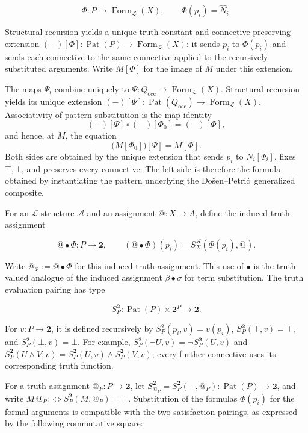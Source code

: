 \documentclass[11pt]{article}
\makeatletter
\newcommand{\atsign}{\mathord{@}}
\newcommand{\DP}{Do\v{s}en--Petri\'{c}}
\makeatother
\begin{document}
\[
\Phi:P\longrightarrow\operatorname{Form}_{\mathcal L}(X),
\qquad \Phi(p_i)=\widehat N_i.
\]

Structural recursion yields a unique truth-constant-and-connective-preserving extension
\((-)[\Phi]:\operatorname{Pat}(P)\to
\operatorname{Form}_{\mathcal L}(X)\): it sends \(p_i\) to \(\Phi(p_i)\)
and sends each connective to the same connective applied to the recursively
substituted arguments. Write \(M[\Phi]\) for the image of \(M\) under this
extension.

The maps \(\Psi_i\) combine uniquely to
\(\Psi:Q_{\mathrm{occ}}\to\operatorname{Form}_{\mathcal L}(X)\).
Structural recursion yields its unique extension
\((-)[\Psi]:\operatorname{Pat}(Q_{\mathrm{occ}})\to
\operatorname{Form}_{\mathcal L}(X)\). Associativity of pattern substitution
is the map identity
\[
(-)[\Psi]\circ(-)[\Phi_0]=(-)[\Phi],
\]
and hence, at \(M\), the equation
\[
\bigl(M[\Phi_0]\bigr)[\Psi]=M[\Phi].
\]
Both sides are obtained by the unique extension that sends \(p_i\) to
\(N_i[\Psi_i]\), fixes \(\top,\bot\), and preserves every connective. The
left side is therefore the formula obtained by instantiating the pattern
underlying the \DP\ generalized composite.

For an \(\mathcal L\)-structure \(\mathcal A\) and an assignment
\(\atsign:X\to A\), define the induced truth assignment

\[
\atsign\mathbin\bullet\Phi:P\longrightarrow\mathbf 2,
\qquad
(\atsign\mathbin\bullet\Phi)(p_i)
=S_X^{\mathcal A}(\Phi(p_i),\atsign).
\]

Write \(\atsign_\Phi:=\atsign\mathbin\bullet\Phi\) for this induced truth
assignment.
This use of \(\mathbin\bullet\) is the truth-valued analogue of the induced
assignment \(\beta\mathbin\bullet\sigma\) for term substitution. The truth
evaluation pairing has type

\[
S_P^{\mathbf 2}:\operatorname{Pat}(P)\times\mathbf 2^P
\longrightarrow\mathbf 2.
\]

For \(v:P\to\mathbf2\), it is defined recursively by
\(S_P^{\mathbf2}(p_i,v)=v(p_i)\),
\(S_P^{\mathbf2}(\top,v)=\top\), and
\(S_P^{\mathbf2}(\bot,v)=\bot\). For example,
\(S_P^{\mathbf2}(\neg U,v)=\neg S_P^{\mathbf2}(U,v)\) and
\(S_P^{\mathbf2}(U\wedge V,v)=
S_P^{\mathbf2}(U,v)\wedge S_P^{\mathbf2}(V,v)\); every further connective
uses its corresponding truth function.

For a truth assignment \(\atsign_P:P\to\mathbf 2\), let
\(S_{\atsign_P}^{\mathbf 2}=S_P^{\mathbf 2}(-,\atsign_P):
\operatorname{Pat}(P)\to\mathbf 2\), and write
\(M\,\atsign_P:\!\Longleftrightarrow
S_P^{\mathbf 2}(M,\atsign_P)=\top\). Substitution of
the formulas \(\Phi(p_i)\) for the formal arguments is compatible with the two
satisfaction pairings, as expressed by the following commutative square:
\end{document}
